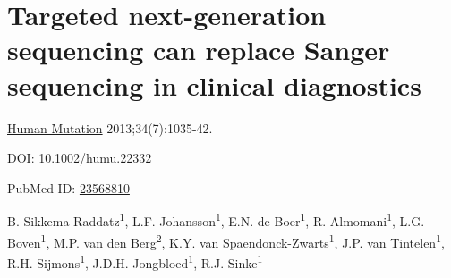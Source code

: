 \chapter[tNGS can replace Sanger sequencing in clinical diagnostics]{Targeted next-generation sequencing can replace Sanger sequencing in clinical diagnostics}
\label{chap:SNP and Indel detection}

{ \Large {} }

\hfill \underline{Human Mutation} 2013;34(7):1035-42.

\hfill DOI: \href{https://doi.org/10.1002/humu.22332}{10.1002/humu.22332}

\hfill PubMed ID: \href{https://www.ncbi.nlm.nih.gov/pubmed/23568810}{23568810}

\newpage

\noindent
B. Sikkema-Raddatz\textsuperscript{1}, L.F. Johansson\textsuperscript{1}, E.N. de Boer\textsuperscript{1}, R. Almomani\textsuperscript{1}, L.G. Boven\textsuperscript{1}, M.P. van den Berg\textsuperscript{2}, K.Y. van Spaendonck-Zwarts\textsuperscript{1}, J.P. van Tintelen\textsuperscript{1}, R.H. Sijmons\textsuperscript{1}, J.D.H. Jongbloed\textsuperscript{1},  R.J. Sinke\textsuperscript{1} \\

